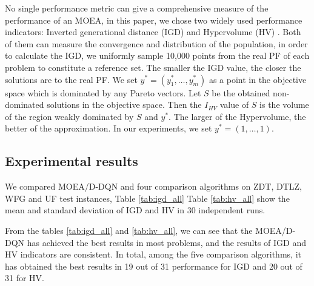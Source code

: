 \documentclass[journal]{IEEEtran}
\begin{document}
No single performance metric can give a comprehensive measure of the performance of an MOEA, in this paper, we chose two widely used performance indicators: Inverted generational distance (IGD) \cite{igd} and Hypervolume (HV) \cite{hv}.
Both of them can measure the convergence and distribution of the population, in order to calculate the IGD, we uniformly sample 10,000 points from the real PF of each problem to constitute a reference set. The smaller the IGD value, the closer the solutions are to the real PF.
We set $y^* = (y^*_1, \dots, y^*_m)$ as a point in the objective space which is dominated by any Pareto vectors. Let $S$ be the obtained non-dominated solutions in the objective space. Then the $I_{HV}$ value of $S$ is the volume of the region weakly dominated by $S$ and $y^*$. The larger of the Hypervolume, the better of the approximation. In our experiments, we set $y^* = (1,\dots, 1).$

\subsection{Experimental results}
We compared MOEA/D-DQN and four comparison algorithms on ZDT, DTLZ, WFG and UF test instances, Table \ref{tab:igd_all} Table \ref{tab:hv_all} show the mean and standard deviation of IGD and HV in 30 independent runs.

From the tables \ref{tab:igd_all} and \ref{tab:hv_all}, we can see that the MOEA/D-DQN has achieved the best results in most problems, and the results of IGD and HV indicators are consistent. In total, among the five comparison algorithms, it has obtained the best results in 19 out of 31 performance for IGD and 20 out of 31 for HV.
\end{document}
